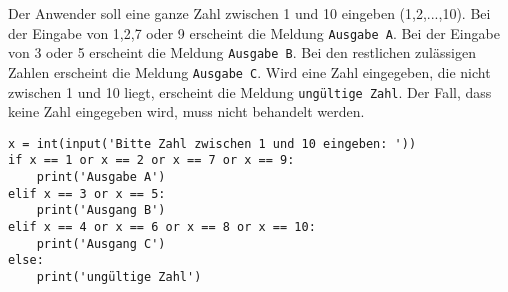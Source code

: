 \question[5]
Der Anwender soll eine ganze Zahl zwischen 1 und 10 eingeben (1,2,...,10).
Bei der Eingabe von 1,2,7 oder 9 erscheint die Meldung
\texttt{Ausgabe A}. Bei der Eingabe von 3 oder 5 erscheint die Meldung
\texttt{Ausgabe B}. Bei den restlichen zulässigen Zahlen erscheint die Meldung
\texttt{Ausgabe C}. Wird eine Zahl eingegeben, die nicht zwischen 1 und 10 liegt, erscheint
die Meldung \texttt{ungültige Zahl}. Der Fall, dass keine Zahl eingegeben wird, muss nicht behandelt werden.

\begin{solutionbox}{8cm}
\begin{lstlisting}
x = int(input('Bitte Zahl zwischen 1 und 10 eingeben: '))
if x == 1 or x == 2 or x == 7 or x == 9:
    print('Ausgabe A')
elif x == 3 or x == 5:
    print('Ausgang B')
elif x == 4 or x == 6 or x == 8 or x == 10:
    print('Ausgang C')
else:
    print('ungültige Zahl')
\end{lstlisting}
\end{solutionbox}
